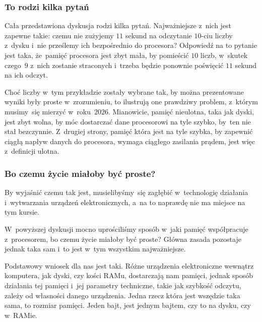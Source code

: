 \documentclass[10pt,t]{beamer}
\begin{document}
\begin{frame}
  \frametitle{To rodzi kilka pytań}


  Cała przedstawiona dyskusja rodzi kilka pytań. Najważniejsze z~nich jest
  zapewne takie: czemu nie zużyjemy $11$ sekund na odczytanie $10$-ciu
  liczby z~dysku i~nie prześlemy ich bezpośrednio do procesora? Odpowiedź
  na to pytanie jest taka, że~pamięć procesora jest zbyt mała, by pomieścić
  $10$ liczb, w~skutek czego~$9$ z~nich zostanie straconych i~trzeba będzie
  ponownie poświęcić $11$ sekund na ich odczyt.

  Choć liczby w~tym przykładzie zostały wybrane tak, by można prezentowane
  wyniki były proste w~zrozumieniu, to ilustrują one prawdziwy problem,
  z~którym musimy~się mierzyć w~roku~$2026$. Mianowicie, pamięć nieulotna,
  taka jak dyski, jest zbyt wolna, by móc dostarczać dane procesorowi na
  tyle szybko, by~ten nie stał bezczynnie. Z~drugiej strony, pamięć która
  jest na tyle szybka, by zapewnić ciągłą napływ danych do procesora,
  wymaga ciągłego zasilania prądem, jest więc z~definicji ulotna.

\end{frame}





\begin{frame}
  \frametitle{Bo czemu życie miałoby być proste?}


  By wyjaśnić czemu tak jest, musielibyśmy~się zagłębić w~technologię
  działania i~wytwarzania urządzeń elektronicznych, a~na to naprawdę nie
  ma miejsce na tym kursie.

  W~powyższej dyskusji mocno uprościliśmy sposób w~jaki pamięć współpracuje
  z~procesorem, bo czemu życie miałoby być proste? Główna zasada pozostaje
  jednak taka sam i~to jest w~tym wszystkim najważniejsze.

  Podstawowy wniosek dla nas jest taki. Różne urządzenia elektroniczne
  wewnątrz komputera, jak dyski, czy kości RAMu, dostarczają
  nam pamięci, jednak sposób działania tej pamięci i~jej parametry
  techniczne, takie jak szybkość odczytu, zależy od własności danego
  urządzenia. Jedna rzecz która jest wszędzie taka sama, to rozmiar pamięci.
  Jeden bajt, jest jednym bajtem, czy to na dysku, czy w~RAMie.

\end{frame}
\end{document}
